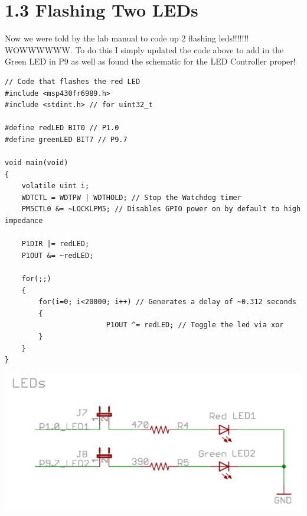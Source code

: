 \documentclass{article}
\begin{document}
\section{1.3 Flashing Two LEDs}
Now we were told by the lab manual to code up 2 flashing leds!!!!!!! WOWWWWWW. To do this I simply updated the code above to add in the Green LED in P9 as well as found the schematic for the LED Controller proper!
\begin{lstlisting}
// Code that flashes the red LED
#include <msp430fr6989.h>
#include <stdint.h> // for uint32_t

#define redLED BIT0 // P1.0
#define greenLED BIT7 // P9.7

void main(void)
{
    volatile uint i;
    WDTCTL = WDTPW | WDTHOLD; // Stop the Watchdog timer
    PM5CTL0 &= ~LOCKLPM5; // Disables GPIO power on by default to high impedance

    P1DIR |= redLED;
    P1OUT &= ~redLED;

    for(;;)
    {
        for(i=0; i<20000; i++) // Generates a delay of ~0.312 seconds
        {
						P1OUT ^= redLED; // Toggle the led via xor
        }
    }
}
\end{lstlisting}
\includegraphics[width=\textwidth]{pictures/1_2.png}
\end{document}
